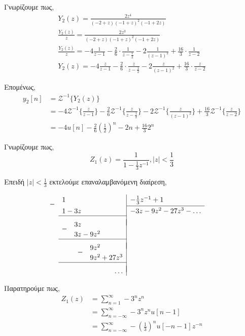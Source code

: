 \documentclass{assignment}
\newcommand{\dropsign}[1]{\smash{\llap{\raisebox{-.5\normalbaselineskip}{$#1$\hspace{2\arraycolsep}}}}}%
\newcommand{\longdivline}{\cline{1-1} \\[\dimexpr-\normalbaselineskip+\jot]}
\begin{document}
\begin{answers}
Γνωρίζουμε πως,
\begin{gather*}
Y_2(z) = \frac{2z^4}{(-2+z)(-1+z)^2(-1+2z)} \\
\frac{Y_2(z)}{z} = \frac{2z^3}{(-2+z)(-1+z)^2(-1+2z)} \\
\frac{Y_2(z)}{z} = -4 \frac{1}{z-1} - \frac{2}{6}\cdot\frac{1}{z-\frac{1}{2}} -2 \frac{1}{(z-1)^2} + \frac{16}{3}\cdot\frac{1}{z-2}\\
Y_2(z) = -4 \frac{z}{z-1} - \frac{2}{6}\cdot\frac{z}{z-\frac{1}{2}} -2 \frac{z}{(z-1)^2} + \frac{16}{3}\cdot\frac{z}{z-2}
\end{gather*}

Επομένως,
\begin{align*}
y_2[n] &= \mathscr{Z}^{-1}\bigg\{Y_2(z)\bigg\} \\
       &= -4\mathscr{Z}^{-1}\bigg\{\frac{z}{z-1}\bigg\} 
          -\frac{2}{6}\mathscr{Z}^{-1}\bigg\{\frac{z}{z-\frac{1}{2}}\bigg\}
          -2\mathscr{Z}^{-1}\bigg\{\frac{z}{(z-1)^2}\bigg\}
          +\frac{16}{3}\mathscr{Z}^{-1}\bigg\{\frac{z}{z-2}\bigg\} \\
       &= -4u[n] - \frac{2}{6}\left(\frac{1}{2}\right)^n - 2n + \frac{16}{3}2^n
\end{align*}

\answer
Γνωρίζουμε πως,
\begin{equation*}
Z_1(z) = \frac{1}{1-\frac{1}{3}z^{-1}}, |z| < \frac{1}{3}
\end{equation*}

Επειδή $|z| < \frac{1}{3}$ εκτελούμε επαναλαμβανόμενη διαίρεση,

\begin{equation*}
  \setlength\extrarowheight{2pt}
  \begin{array}{r|l}
    \dropsign{-} 1\hphantom{{}+{}0z{}+{}0z^2{}+{}00z^3}& -\frac{1}{3}z^{-1} + 1 \\[2pt] \cline{2-2}
    1 - 3z\hphantom{{}+{}0z^2{}+{}00z^3}& -3z - 9z^2 - 27z^3 - \dots \\ \longdivline
    \dropsign{-} 3z\hphantom{{}-{}0z^2{}+{}00z^3}&\\
                 3z - 9z^2\hphantom{{}+{}00z^3}&\\ \longdivline
    \dropsign{-} 9z^2\hphantom{{}-{}00z^3}&\\
                 9z^2 + 27z^3&\\ \longdivline
                        \dots&
  \end{array}
\end{equation*}

Παρατηρούμε πως,
\begin{align*}
Z_1(z) &= \sum_{n=1}^{\infty} -3^nz^n \\
       &= \sum_{n=-\infty}^{\infty} -3^nz^nu[n-1] \\
       &= \sum_{n=-\infty}^{\infty} -\left(\frac{1}{3}\right)^n u[-n-1] z^{-n}
\end{align*}


\end{answers}
\end{document}
